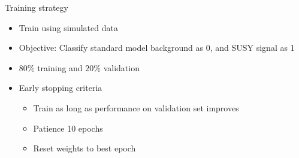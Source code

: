 \documentclass[UKenglish]{beamer}
\begin{document}
\begin{frame}{Training strategy}
    \begin{itemize}
        \item Train using simulated data 
        \item Objective: Classify standard model background as 0, and SUSY signal as 1
        \item $80\%$ training and $20\%$ validation 
        \item Early stopping criteria
        \begin{itemize}
            \item Train as long as performance on validation set improves 
            \item Patience 10 epochs
            \item Reset weights to best epoch
        \end{itemize}
    \end{itemize}
\end{frame}
\end{document}

